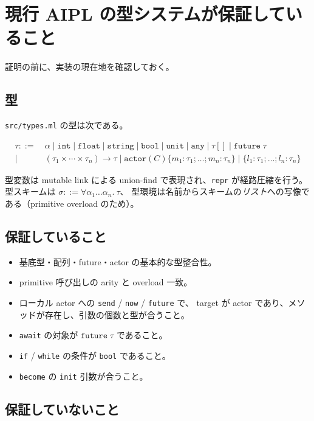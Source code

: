 \documentclass[11pt,a4paper]{ltjsarticle}
\theoremstyle{definition}
\theoremstyle{remark}
\newcommand{\tint}{\mathtt{int}}
\newcommand{\tbool}{\mathtt{bool}}
\newcommand{\tunit}{\mathtt{unit}}
\newcommand{\tfut}[1]{\mathtt{future}\;#1}
\begin{document}
\section{現行 AIPL の型システムが保証していること}

証明の前に、実装の現在地を確認しておく。

\subsection{型}

\verb|src/types.ml| の型は次である。

\begin{align*}
\tau ::=\ & \alpha \mid \tint \mid \mathtt{float} \mid \mathtt{string}
       \mid \tbool \mid \tunit \mid \mathtt{any}
       \mid \tau[] \mid \tfut{\tau}\\
   \mid\ & (\tau_1 \times \cdots \times \tau_n) \to \tau
       \mid \mathtt{actor}(C)\{m_1{:}\tau_1; \ldots; m_n{:}\tau_n\}
       \mid \{l_1{:}\tau_1; \ldots; l_n{:}\tau_n\}
\end{align*}

型変数は mutable link による union-find で表現され、\verb|repr| が経路圧縮を行う。
型スキームは $\sigma ::= \forall \alpha_1 \ldots \alpha_n.\ \tau$、
型環境は名前からスキームの\emph{リスト}への写像である（primitive overload のため）。

\subsection{保証していること}

\begin{itemize}
\item 基底型・配列・future・actor の基本的な型整合性。
\item primitive 呼び出しの arity と overload 一致。
\item ローカル actor への \verb|send| / \verb|now| / \verb|future| で、
      target が actor であり、メソッドが存在し、引数の個数と型が合うこと。
\item \verb|await| の対象が $\tfut{\tau}$ であること。
\item \verb|if| / \verb|while| の条件が \verb|bool| であること。
\item \verb|become| の \verb|init| 引数が合うこと。
\end{itemize}

\subsection{保証していないこと}
\end{document}
